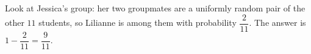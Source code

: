 Look at Jessica's group: her two groupmates are a uniformly random pair of the other $11$ students, so Lilianne is among them with probability $\dfrac{2}{11}$. The answer is $1-\dfrac2{11}=\boxed{\dfrac9{11}}$.
